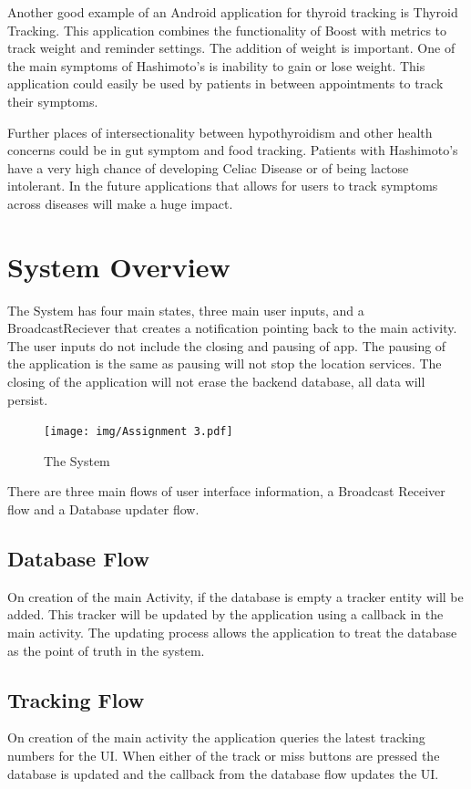 \documentclass{article}
\begin{document}
Another good example of an Android application for thyroid tracking is Thyroid Tracking. This application combines the functionality of Boost with metrics to track weight and reminder settings. The addition of weight is important. One of the main symptoms of Hashimoto's is inability to gain or lose weight. This application could easily be used by patients in between appointments to track their symptoms.\citep{ThyroidTracker}

Further places of intersectionality between hypothyroidism and other health concerns could be in gut symptom and food tracking. Patients with Hashimoto's have a very high chance of developing Celiac Disease or of being lactose intolerant. In the future applications that allows for users to track symptoms across diseases will make a huge impact.



\section{System Overview}
The System has four main states, three main user inputs, and a BroadcastReciever that creates a notification pointing back to the main activity. The user inputs do not include the closing and pausing of app. The pausing of the application is the same as pausing will not stop the location services. The closing of the application will not erase the backend database, all data will persist.

\begin{figure}[H]
\centering
\texttt{[image: img/Assignment 3.pdf]}
\caption{The System}
\label{fig:system}
\end{figure}

There are three main flows of user interface information, a Broadcast Receiver flow and a Database updater flow. 

\subsection{Database Flow}
On creation of the main Activity, if the database is empty a tracker entity will be added. This tracker will be updated by the application using a callback in the main activity. The updating process allows the application to treat the database as the point of truth in the system.

\subsection{Tracking Flow}
On creation of the main activity the application queries the latest tracking numbers for the UI. When either of the track or miss buttons are pressed the database is updated and the callback from the database flow updates the UI.
\end{document}
